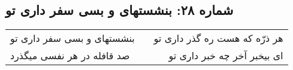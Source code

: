 \begin{center}
\section*{شماره ۲۸: بنشستهای و بسی سفر داری تو}
\label{sec:028}
\begin{longtable}{l p{0.5cm} r}
بنشستهای و بسی سفر داری تو
&&
هر ذرّه که هست ره گذر داری تو
\\
صد قافله در هر نفسی میگذرد
&&
ای بیخبر آخر چه خبر داری تو
\\
\end{longtable}
\end{center}
